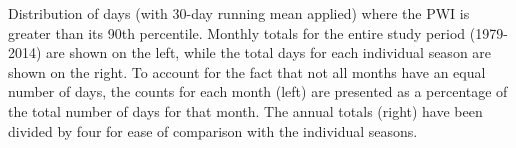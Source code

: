 \label{fig:annual_distribution}
Distribution of days (with 30-day running mean applied) where the PWI is greater than its 90th percentile. Monthly totals for the entire study period (1979-2014) are shown on the left, while the total days for each individual season are shown on the right. To account for the fact that not all months have an equal number of days, the counts for each month (left) are presented as a percentage of the total number of days for that month. The annual totals (right) have been divided by four for ease of comparison with the individual seasons.   

